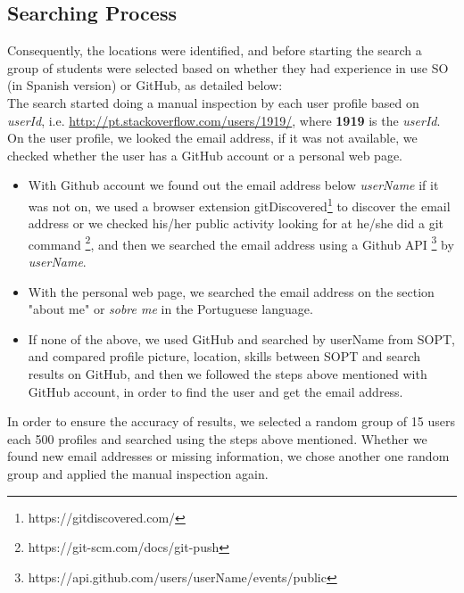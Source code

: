 \subsection{Searching Process}
Consequently, the locations were identified, and before starting the search a group of students were selected based on whether they had experience in use SO (in Spanish version) or GitHub, as detailed below:\\
The search started doing a manual inspection by each user profile based on \textit{userId}, i.e. \url{http://pt.stackoverflow.com/users/1919/}, where \textbf{1919} is the \textit{userId}. On the user profile, we looked the email address, if it was not available, we checked whether the user has a GitHub account or a personal web page. 
        \begin{itemize}
            \item With Github account we found out the email address below \textit{userName} if it was not on, we used a browser extension gitDiscovered\footnote{https://gitdiscovered.com/} to discover the email address or we checked his/her public activity looking for at he/she did a git command \footnote{https://git-scm.com/docs/git-push}, and then we searched the email address using a Github API \footnote{https://api.github.com/users/userName/events/public} by \textit{userName}.
            \item With the personal web page, we searched the email address on the section "about me" or \textit{sobre me} in the Portuguese language.
            \item If none of the above, we used GitHub and searched by userName from SOPT, and compared profile picture, location, skills between SOPT and search results on GitHub, and then we followed the steps above mentioned with GitHub account, in order to find the user and get the email address.              
       \end{itemize}            
 
In order to ensure the accuracy of results, we selected a random group of 15 users each 500 profiles and searched using the steps above mentioned. Whether we found new email addresses or missing information, we chose another one random group and applied the manual inspection again.

